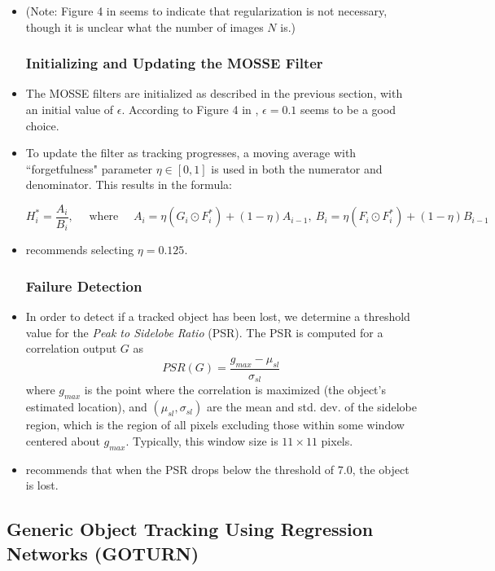 \documentclass[12pt]{article}
\begin{document}
\begin{itemize}
\item (Note: Figure 4 in \cite{bolme_mosse} seems to indicate that regularization is not necessary, though it is unclear what the number of images $N$ is.)


\subsubsection*{Initializing and Updating the MOSSE Filter}

\item The MOSSE filters are initialized as described in the previous section, with an initial value of $\epsilon$. According to Figure 4 in \cite{bolme_mosse}, $\epsilon = 0.1$ seems to be a good choice.

\item To update the filter as tracking progresses, a moving average with ``forgetfulness" parameter $\eta \in [0,1]$ is used in both the numerator and denominator. This results in the formula:

$$H_i^* = \frac{A_i}{B_i},\quad \text{ where } \quad A_i = \eta(G_i \odot F_i^*) + (1-\eta)A_{i-1},\ B_i = \eta(F_i \odot F_i^*) + (1-\eta)B_{i-1}$$

\item \cite{bolme_mosse} recommends selecting $\eta = 0.125$.

\subsubsection*{Failure Detection}

\item In order to detect if a tracked object has been lost, we determine a threshold value for the \textit{Peak to Sidelobe Ratio} (PSR). The PSR is computed for a correlation output $G$ as $$PSR(G) = \frac{g_{max} - \mu_{sl}}{\sigma_{sl}}$$ where $g_{max}$ is the point where the correlation is maximized (the object's estimated location), and $(\mu_{sl},\sigma_{sl})$ are the mean and std. dev. of the sidelobe region, which is the region of all pixels excluding those within some window centered about $g_{max}$. Typically, this window size is $11\times 11$ pixels.

\item \cite{bolme_mosse} recommends that when the PSR drops below the threshold of 7.0, the object is lost.

\end{itemize}


\subsection{Generic Object Tracking Using Regression Networks (GOTURN)}
\end{document}
